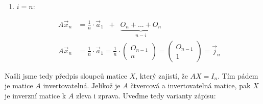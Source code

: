 \documentclass[12pt]{article}
\begin{document}
\begin{enumerate}
\begin{enumerate}
\begin{enumerate}
              \begin{align*}
                A\vec{x}_i &= \underbrace{O_n + ... + O_n}_{n-i-1} \;\;+\;\;  \frac{1}{i} \cdot (-1) \cdot \vec{a}_{n-i} \;\;+\;\; \frac{1}{i} \cdot \vec{a}_{n-i+1}
                \;\;+\;\; \underbrace{O_n + ... + O_n}_{i-1} \\
                &= \frac{1}{i} (\vec{a}_{n-i+1} - \vec{a}_{n-i})
                \overset{(*)}{=} \frac{1}{i} \left(\begin{array}{c} 
                  O_{n-(n-i+1)} \\ \hline n-(n-i+1)+1 \\ \hline O_{(n-i+1)-1}
                \end{array}\right)
                = \frac{1}{i} \left(\begin{array}{c} 
                  O_{i-1} \\ \hline i \\ \hline O_{n-i}
                \end{array}\right) \\
                A\vec{x}_i &= \left(\begin{array}{c} 
                  O_{i-1} \\ \hline 1 \\ \hline O_{n-i}
                \end{array}\right) = \vec{j}_i
              \end{align*}
            
            \item $i=n$:
            
              \begin{align*}
                A\vec{x}_n &= \frac{1}{n} \cdot \vec{a}_1 \;\;+\;\;  \underbrace{O_n + ... + O_n}_{n-i} \\
                A\vec{x}_n &= \frac{1}{n} \cdot \vec{a}_1 = \frac{1}{n} \cdot \left(\begin{array}{c} 
                  O_{n-1} \\ \hline n
                \end{array}\right) = \left(\begin{array}{c} 
                  O_{n-1} \\ \hline 1
                \end{array}\right) = \vec{j}_n
              \end{align*}
          \end{enumerate}

        Našli jsme tedy předpis sloupců matice $X$, který zajistí, že $AX=I_n$.
        Tím pádem je matice $A$ invertovatelná. Jelikož je $A$ čtvercová a invertovatelná matice,
        pak $X$ je inverzní matice k $A$ zleva i zprava.
        Uveďme tedy varianty zápisu:
        \renewcommand{\arraystretch}{1.4}


\end{enumerate}
\end{enumerate}
\end{document}
